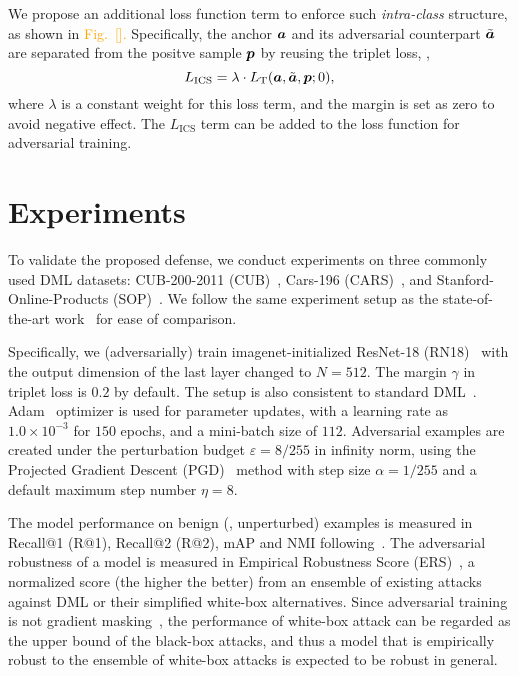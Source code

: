 \documentclass[10pt,twocolumn,letterpaper]{article}
\newcommand{\oo}[1]{\textcolor{orange}{#1}}
\begin{document}

We propose an additional loss function term to enforce such \emph{intra-class}
structure, as shown in \oo{Fig.~[].}
%
Specifically, the anchor ${\bm{a}}$ and its adversarial counterpart $\tilde{{\bm{a}}}$
are separated from the positve sample ${\bm{p}}$ by reusing the triplet loss,
\ie,
%
\begin{equation}
	L_\text{ICS} = \lambda \cdot L_\text{T}(
	{\bm{a}}, \tilde{{\bm{a}}}, {\bm{p}}; 0),
\end{equation}
%
where $\lambda$ is a constant weight for this loss term,
and the margin is set as zero to avoid negative effect.
%
The $L_\text{ICS}$ term can be added to the loss function for
adversarial training.

\section{Experiments}
\label{sec:4}


To validate the proposed defense, we conduct experiments
on three commonly used DML datasets: CUB-200-2011 (CUB)~\cite{cub200}, Cars-196
(CARS)~\cite{cars196}, and Stanford-Online-Products (SOP)~\cite{sop}.
%
We follow the same experiment setup as the state-of-the-art work~\cite{robrank}
for ease of comparison.


Specifically, we (adversarially) train imagenet-initialized ResNet-18
(RN18)~\cite{resnet} with the output dimension of the last layer changed to
$N{=}512$.
%
The margin $\gamma$ in triplet loss is $0.2$ by default.
%
The setup is also consistent to standard DML~\cite{revisiting}.
%
Adam~\cite{adam} optimizer is used for parameter updates, with a learning rate
as $1.0{\times}10^{-3}$ for $150$ epochs, and a mini-batch size of $112$.
%
Adversarial examples are created under the perturbation budget
$\varepsilon{=}8/255$ in infinity norm, using the
Projected Gradient Descent (PGD)~\cite{madry} method with step size $\alpha{=}1/255$ 
and a default maximum step number $\eta{=}8$.
%

The model performance on benign (\ie, unperturbed) examples is measured in
Recall@1 (R@1), Recall@2 (R@2), mAP and NMI
following~\cite{revisiting,robrank}.
%
The adversarial robustness of a model is measured in Empirical Robustness Score
(ERS)~\cite{robrank}, a normalized score (the higher the better) from
an ensemble of existing attacks against DML or their simplified white-box
alternatives.
%
Since adversarial training is not gradient masking~\cite{obfuscated}, the
performance of white-box attack can be regarded as the upper bound of the
black-box attacks, and thus a model that is empirically robust to the ensemble
of white-box attacks is expected to be robust in general.
\end{document}
